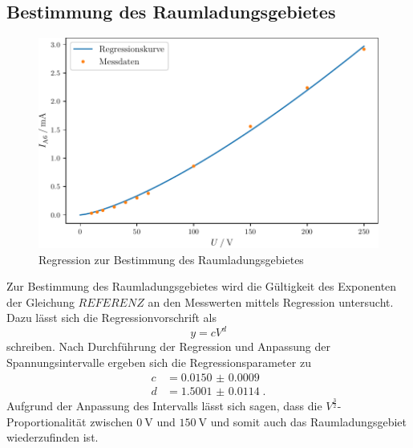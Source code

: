 \subsection{Bestimmung des Raumladungsgebietes}
\begin{figure}
    \centering
    \caption{Regression zur Bestimmung des Raumladungsgebietes}
    \label{fig:exponent}
    \includegraphics[width = \textwidth]{build/exponent.pdf}
\end{figure}
Zur Bestimmung des Raumladungsgebietes wird die Gültigkeit des Exponenten der Gleichung $REFERENZ$ an den Messwerten mittels Regression untersucht.
Dazu lässt sich die Regressionvorschrift als
\begin{equation}
    y = cV^d
\end{equation} 
schreiben.
Nach Durchführung der Regression und Anpassung der Spannungsintervalle ergeben sich die Regressionsparameter zu
\begin{align*}
    c & = \num{0.0150(9)} \\ 
    d & = \num{1.5001(114)} \; \text{.}
\end{align*}
Aufgrund der Anpassung des Intervalls lässt sich sagen, dass die $V^\frac{3}{2}$-Proportionalität zwischen $\SI{0}{\volt}$ und $\SI{150}{\volt}$ 
und somit auch das Raumladungsgebiet wiederzufinden ist.
